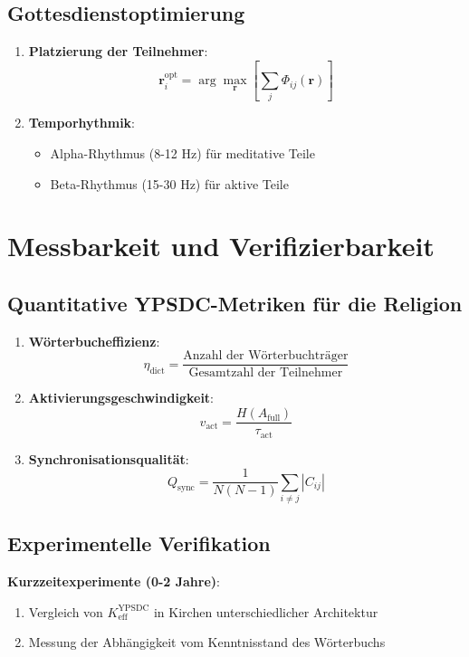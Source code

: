 \documentclass[12pt,a4paper]{article}
\begin{document}
	\subsection{Gottesdienstoptimierung}
	
	\begin{enumerate}
		\item \textbf{Platzierung der Teilnehmer}:
		\[
		\mathbf{r}_i^{\mathrm{opt}} = \arg\max_{\mathbf{r}} \left[\sum_j \Phi_{ij}(\mathbf{r})\right]
		\]
		\item \textbf{Temporhythmik}:
		\begin{itemize}
			\item Alpha-Rhythmus (8-12 Hz) für meditative Teile
			\item Beta-Rhythmus (15-30 Hz) für aktive Teile
		\end{itemize}
	\end{enumerate}
	
	\section{Messbarkeit und Verifizierbarkeit}
	
	\subsection{Quantitative YPSDC-Metriken für die Religion}
	
	\begin{enumerate}
		\item \textbf{Wörterbucheffizienz}:
		\[
		\eta_{\mathrm{dict}} = \frac{\text{Anzahl der Wörterbuchträger}}{\text{Gesamtzahl der Teilnehmer}}
		\]
		\item \textbf{Aktivierungsgeschwindigkeit}:
		\[
		v_{\mathrm{act}} = \frac{H(A_{\mathrm{full}})}{\tau_{\mathrm{act}}}
		\]
		\item \textbf{Synchronisationsqualität}:
		\[
		Q_{\mathrm{sync}} = \frac{1}{N(N-1)} \sum_{i \neq j} |C_{ij}|
		\]
	\end{enumerate}
	
	\subsection{Experimentelle Verifikation}
	
	\textbf{Kurzzeitexperimente (0-2 Jahre)}:
	\begin{enumerate}
		\item Vergleich von $K_{\mathrm{eff}}^{\mathrm{YPSDC}}$ in Kirchen unterschiedlicher Architektur
		\item Messung der Abhängigkeit vom Kenntnisstand des Wörterbuchs
	\end{enumerate}
	
\end{document}
